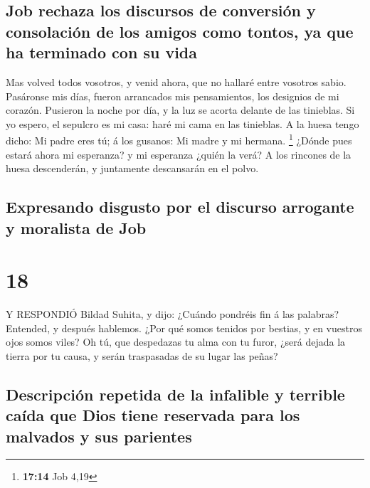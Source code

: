 \hypertarget{job-rechaza-los-discursos-de-conversiuxf3n-y-consolaciuxf3n-de-los-amigos-como-tontos-ya-que-ha-terminado-con-su-vida}{%
\subsection{Job rechaza los discursos de conversión y consolación de los
amigos como tontos, ya que ha terminado con su
vida}\label{job-rechaza-los-discursos-de-conversiuxf3n-y-consolaciuxf3n-de-los-amigos-como-tontos-ya-que-ha-terminado-con-su-vida}}

 Mas volved todos vosotros, y venid ahora, que no hallaré
entre vosotros sabio.  Pasáronse mis días, fueron
arrancados mis pensamientos, los designios de mi corazón. 
Pusieron la noche por día, y la luz se acorta delante de las tinieblas.
 Si yo espero, el sepulcro es mi casa: haré mi cama en las
tinieblas.  A la huesa tengo dicho: Mi padre eres tú; á los
gusanos: Mi madre y mi hermana. \footnote{\textbf{17:14} Job 4,19}
 ¿Dónde pues estará ahora mi esperanza? y mi esperanza
¿quién la verá?  A los rincones de la huesa descenderán, y
juntamente descansarán en el polvo.

\hypertarget{expresando-disgusto-por-el-discurso-arrogante-y-moralista-de-job}{%
\subsection{Expresando disgusto por el discurso arrogante y moralista de
Job}\label{expresando-disgusto-por-el-discurso-arrogante-y-moralista-de-job}}

\hypertarget{section-17}{%
\section{18}\label{section-17}}

 Y RESPONDIÓ Bildad Suhita, y dijo:  ¿Cuándo
pondréis fin á las palabras? Entended, y después hablemos. 
¿Por qué somos tenidos por bestias, y en vuestros ojos somos viles?
 Oh tú, que despedazas tu alma con tu furor, ¿será dejada la
tierra por tu causa, y serán traspasadas de su lugar las peñas?

\hypertarget{descripciuxf3n-repetida-de-la-infalible-y-terrible-cauxedda-que-dios-tiene-reservada-para-los-malvados-y-sus-parientes}{%
\subsection{Descripción repetida de la infalible y terrible caída que
Dios tiene reservada para los malvados y sus
parientes}\label{descripciuxf3n-repetida-de-la-infalible-y-terrible-cauxedda-que-dios-tiene-reservada-para-los-malvados-y-sus-parientes}}

